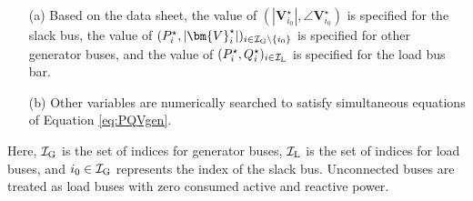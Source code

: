 \documentclass[graybox, envcountchap]{svmult}
\begin{document}
\medskip
\begin{breakbox}
\begin{itemize}
  \item[(a)] Based on the data sheet, the value of $(|\bm{V}_{i_0}^{\star}|,\angle
  \bm{V}_{i_0}^{\star})$ is specified for the slack bus, the value of
  $(P_i^{\star},|\bm{V}_{i}^{\star}|)_{i \in \mathcal{I}_{\rm G}\setminus\{i_0\}
  }$ is specified for other generator buses, and the value of
  $(P_i^{\star},Q_i^{\star})_{i \in \mathcal{I}_{\rm L}}$ is specified for the
  load bus bar.
  \item[(b)] Other variables are numerically searched to satisfy simultaneous
  equations of Equation \ref{eq:PQVgen}.
\end{itemize}
\end{breakbox}
\medskip

Here, $\mathcal{I}_{\rm G}$ is the set of indices for generator buses,
$\mathcal{I}_{\rm L}$ is the set of indices for load buses, and $i_0 \in
\mathcal{I}_{\rm G}$ represents the index of the slack bus. Unconnected buses
are treated as load buses with zero consumed active and reactive power.


%
\end{document}
